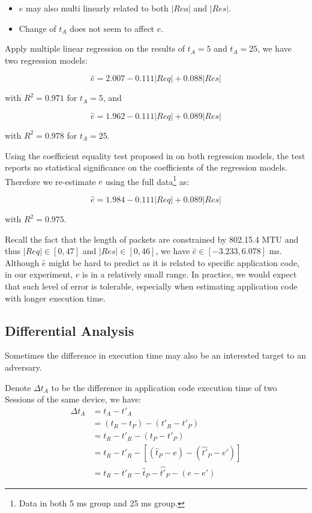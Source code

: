 \begin{itemize}
	\item $e$ may also multi linearly related to both $|Rea|$ and $|Res|$.
	\item Change of $t_A$ does not seem to affect $e$.
\end{itemize}

Apply multiple linear regression on the results of $t_A = 5$ and $t_A = 25$, we have two regression models:

\begin{equation}
	\hat{e} = 2.007 - 0.111|Req| + 0.088|Res|
\end{equation}

with $R^2 = 0.971$ for $t_A = 5$, and

\begin{equation}
	\hat{e} = 1.962 - 0.111|Req| + 0.089|Res|
\end{equation}

with $R^2 = 0.978$ for $t_A = 25$.

Using the coefficient equality test proposed in \cite{CoeEqTest} on both regression models, the test reports no statistical significance on the coefficients of the regression models. Therefore we re-estimate $e$ using the full data\footnote{Data in both 5 ms group and 25 ms group.} as:

\begin{equation} \label{hate}
	\hat{e} = 1.984 - 0.111|Req| + 0.089|Res|
\end{equation}

with $R^2 = 0.975$.

Recall the fact that the length of packets are constrained by 802.15.4 MTU and thus $|Req| \in [0,47]$ and $|Res| \in [0,46]$, we have $\hat{e} \in [-3.233,6.078]$ ms. Although $\hat{e}$ might be hard to predict as it is related to specific application code, in our experiment, $e$ is in a relatively small range. In practice, we would expect that such level of error is tolerable, especially when estimating application code with longer execution time.

\subsection{Differential Analysis}

Sometimes the difference in execution time may also be an interested target to an adversary. 

Denote $\Delta t_A$ to be the difference in application code execution time of two Sessions of the same device, we have:
\begin{equation}\label{Eq: delta t}
	\begin{aligned}
		\Delta t_A &= t_A - t'_A \\
			&= (t_R - t_P) - (t'_R - t'_P) \\
			&= t_R - t'_R - (t_P - t'_P) \\
			&= t_R - t'_R - [(\hat{t}_P - e) - (\hat{t'}_P - e')] \\
			&= t_R - t'_R - \hat{t}_P - \hat{t'}_P - (e - e')
	\end{aligned}
\end{equation}
 
